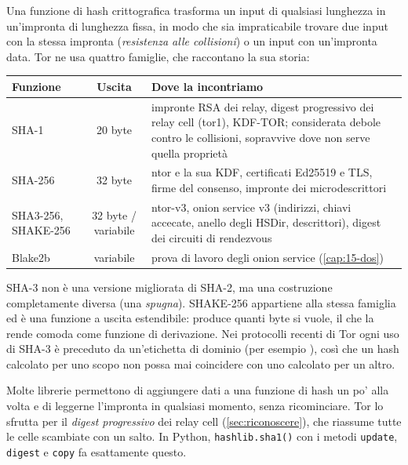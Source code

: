 Una funzione di hash crittografica trasforma un input di qualsiasi lunghezza in un'impronta di lunghezza fissa, in modo che sia impraticabile trovare due input con la stessa impronta (\emph{resistenza alle collisioni}) o un input con un'impronta data. Tor ne usa quattro famiglie, che raccontano la sua storia:
\begin{center}\small
\begin{tabularx}{\textwidth}{@{}l c >{\raggedright\arraybackslash}X@{}}
\toprule
Funzione & Uscita & Dove la incontriamo \\
\midrule
SHA-1 & 20 byte & impronte RSA dei relay, digest progressivo dei relay cell (tor1), KDF-TOR; considerata debole contro le collisioni, sopravvive dove non serve quella proprietà \\
SHA-256 & 32 byte & ntor e la sua KDF, certificati Ed25519 e TLS, firme del consenso, impronte dei microdescrittori \\
SHA3-256, SHAKE-256 & 32 byte / variabile & ntor-v3, onion service v3 (indirizzi, chiavi accecate, anello degli HSDir, descrittori), digest dei circuiti di rendezvous \\
Blake2b & variabile & prova di lavoro degli onion service (\cref{cap:15-dos}) \\
\bottomrule
\end{tabularx}
\end{center}

SHA-3 non è una versione migliorata di SHA-2, ma una costruzione completamente diversa (una \emph{spugna}). SHAKE-256 appartiene alla stessa famiglia ed è una funzione a uscita estendibile: produce quanti byte si vuole, il che la rende comoda come funzione di derivazione. Nei protocolli recenti di Tor ogni uso di SHA-3 è preceduto da un'etichetta di dominio (per esempio ), così che un hash calcolato per uno scopo non possa mai coincidere con uno calcolato per un altro.

\begin{approfondimento}
Molte librerie permettono di aggiungere dati a una funzione di hash un po' alla volta e di leggerne l'impronta in qualsiasi momento, senza ricominciare. Tor lo sfrutta per il \emph{digest progressivo} dei relay cell (\cref{sec:riconoscere}), che riassume tutte le celle scambiate con un salto. In Python, \texttt{hashlib.sha1()} con i metodi \texttt{update}, \texttt{digest} e \texttt{copy} fa esattamente questo.
\end{approfondimento}

